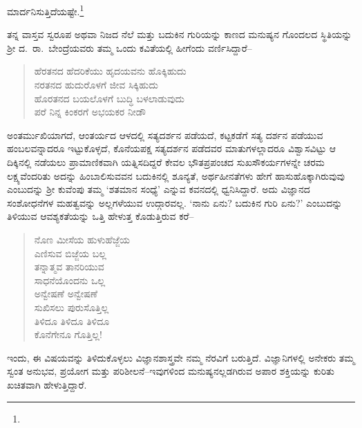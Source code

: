 ಮಾರ್ದನಿಸುತ್ತಿದೆಯಷ್ಟೇ.\footnote{\hfill{}


}

ತನ್ನ ವಾಸ್ತವ ಸ್ವರೂಪ ಅಥವಾ ನಿಜದ ನೆಲೆ ಮತ್ತು ಬದುಕಿನ ಗುರಿಯನ್ನು ಕಾಣದ ಮನುಷ್ಯನ ಗೊಂದಲದ ಸ್ಥಿತಿಯನ್ನು ಶ‍್ರೀ ದ.\ ರಾ.\ ಬೇಂದ್ರೆಯವರು ತಮ್ಮ ಒಂದು ಕವಿತೆಯಲ್ಲಿ ಹೀಗೆಂದು ವರ್ಣಿಸಿದ್ದಾರೆ–

\begin{verse}
ಹೆರತನದ ಹೆದರಿಕೆಯು ಹೃದಯವನು ಹೊಕ್ಕಿಹುದು\\ನರತನದ ಹುದುರೊಳಗೆ ಜೀವ ಸಿಕ್ಕಿಹುದು\\ಹೊರತನದ ಬಯಲೊಳಗೆ ಬುದ್ಧಿ ಬಳಲಾಡುವುದು\\ಪರೆ ನಿನ್ನ ಕಿಂಕರಗೆ ಅಭಯಕರ ನೀಡೌ
\end{verse}

ಅಂತರ್ಮುಖಿಯಾಗದೆ, ಆಂತರ್ಯದ ಆಳದಲ್ಲಿ ಸತ್ಯದರ್ಶನ ಪಡೆಯದೆ, ಕಟ್ಟಕಡೆಗೆ ಸತ್ಯ ದರ್ಶನ ಪಡೆಯುವ ಹಂಬಲವನ್ನಾದರೂ ಇಟ್ಟುಕೊಳ್ಳದೆ, ಕೊನೆಯಪಕ್ಷ ಸತ್ಯದರ್ಶನ ಪಡೆದವರ ಮಾತುಗಳಲ್ಲಾದರೂ ವಿಶ್ವಾಸವಿಟ್ಟು ಆ ದಿಕ್ಕಿನಲ್ಲಿ ನಡೆಯಲು ಪ್ರಾಮಾಣಿಕವಾಗಿ ಯತ್ನಿಸದಿದ್ದರೆ ಕೇವಲ ಭೌತಪ್ರಪಂಚದ ಸುಖಸೌಕರ್ಯಗಳನ್ನೇ ಚರಮ ಲಕ್ಷ್ಯವೆಂದರಿತು ಅದನ್ನು ಹಿಂಬಾಲಿಸು\-ವವನ ಬದುಕಿನಲ್ಲಿ ಶೂನ್ಯತೆ, ಅರ್ಥಹೀನತೆಗಳು ಹೇಗೆ ಹಾಸುಹೊಕ್ಕಾಗಿರುವುವು ಎಂಬುದನ್ನು ಶ‍್ರೀ ಕುವೆಂಪು ತಮ್ಮ ‘ಶತಮಾನ ಸಂಧ್ಯೆ’ ಎನ್ನುವ ಕವನದಲ್ಲಿ ಧ್ವನಿಸಿದ್ದಾರೆ. ಅದು ವಿಜ್ಞಾನದ ಸಂಶೋಧನೆಗಳ ಮಹತ್ವವನ್ನು ಅಲ್ಲಗಳೆಯುವ ಉದ್ಗಾರವಲ್ಲ. ‘ನಾನು ಏನು? ಬದುಕಿನ ಗುರಿ ಏನು?’ ಎಂಬುದನ್ನು ತಿಳಿಯುವ ಆವಶ್ಯಕತೆಯನ್ನು ಒತ್ತಿ ಹೇಳುತ್ತ ಕೊಡುತ್ತಿರುವ ಕರೆ–

\begin{verse}
ನೊಣ ಮೀಸೆಯ ಹುಳುಹೆಜ್ಜೆಯ\\ಎಣಿಸುವ ಬಿಜ್ಜೆಯ ಬಲ್ಲ\\ತನ್ನಾತ್ಮವ ತಾನರಿಯುವ\\ಸಾಧನೆಯೊಂದನು ಒಲ್ಲ\\ಅನ್ವೇಷಣೆ ಅನ್ವೇಷಣೆ\\ಸುಖಿಸಲು ಪುರುಸೊತ್ತಿಲ್ಲ\\ತಿಳಿದೂ ತಿಳಿದೂ ತಿಳಿದೂ\\ಕೊನೆಗೇನೂ ಗೊತ್ತಿಲ್ಲ!
\end{verse}

ಇಂದು, ಈ ವಿಷಯವನ್ನು ತಿಳಿದುಕೊಳ್ಳಲು ವಿಜ್ಞಾನಶಾಸ್ತ್ರವೇ ನಮ್ಮ ನೆರವಿಗೆ ಬರುತ್ತಿದೆ. ವಿಜ್ಞಾನಿಗಳಲ್ಲಿ ಅನೇಕರು ತಮ್ಮ ಸ್ವಂತ ಅನುಭವ, ಪ್ರಯೋಗ ಮತ್ತು ಪರಿಶೀಲನೆ–ಇವುಗಳಿಂದ ಮನುಷ್ಯನಲ್ಲಡಗಿರುವ ಅಪಾರ ಶಕ್ತಿಯನ್ನು ಕುರಿತು ಖಚಿತವಾಗಿ ಹೇಳುತ್ತಿದ್ದಾರೆ.

\vskip 2pt



